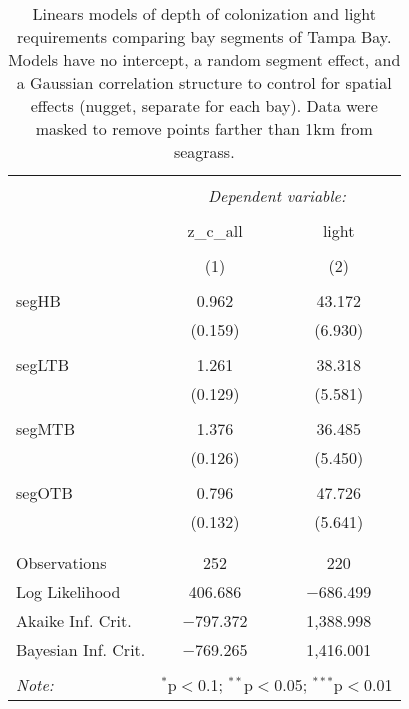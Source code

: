 \documentclass[letterpaper,12pt]{article}\usepackage[]{graphicx}\usepackage[]{color}
\begin{document}
\begin{table}[!htbp] \centering 
  \caption{Linears models of depth of colonization and light requirements comparing bay segments of Tampa Bay.  Models have no intercept, a random segment effect, and a Gaussian correlation structure to control for spatial effects (nugget, separate for each bay). Data were masked to remove points farther than 1km from seagrass.} 
  \label{} 
\begin{tabular}{@{\extracolsep{5pt}}lcc} 
\\[-1.8ex]\hline 
\hline \\[-1.8ex] 
 & \multicolumn{2}{c}{\textit{Dependent variable:}} \\ 
\cline{2-3} 
\\[-1.8ex] & z\_c\_all & light \\ 
\\[-1.8ex] & (1) & (2)\\ 
\hline \\[-1.8ex] 
 segHB & 0.962 & 43.172 \\ 
  & (0.159) & (6.930) \\ 
  & & \\ 
 segLTB & 1.261 & 38.318 \\ 
  & (0.129) & (5.581) \\ 
  & & \\ 
 segMTB & 1.376 & 36.485 \\ 
  & (0.126) & (5.450) \\ 
  & & \\ 
 segOTB & 0.796 & 47.726 \\ 
  & (0.132) & (5.641) \\ 
  & & \\ 
\hline \\[-1.8ex] 
Observations & 252 & 220 \\ 
Log Likelihood & 406.686 & $-$686.499 \\ 
Akaike Inf. Crit. & $-$797.372 & 1,388.998 \\ 
Bayesian Inf. Crit. & $-$769.265 & 1,416.001 \\ 
\hline 
\hline \\[-1.8ex] 
\textit{Note:}  & \multicolumn{2}{r}{$^{*}$p$<$0.1; $^{**}$p$<$0.05; $^{***}$p$<$0.01} \\ 
\end{tabular} 
\end{table} 
\end{document}
